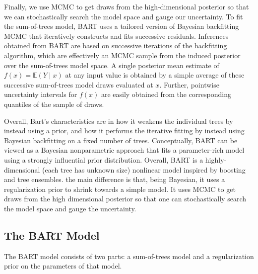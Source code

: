\documentclass[a4paper,11pt]{article}
\begin{document}
Finally, we use MCMC to get draws from the high-dimensional posterior so that  we can stochastically search the model space and gauge our uncertainty. To fit the sum-of-trees model, BART uses a tailored version of Bayesian backfitting MCMC \cite{hastie2000} that iteratively constructs and fits successive residuals.  Inferences obtained from BART are based on successive iterations of the backfitting algorithm, which are effectively an MCMC sample from the induced posterior over the sum-of-trees model space. A single posterior mean estimate of \( f(x) = \mathbb{E}(Y \mid x) \) at any input value is obtained by a simple average of these successive sum-of-trees model draws evaluated at \( x \). Further, pointwise uncertainty intervals for \( f(x) \) are easily obtained from the corresponding quantiles of the sample of draws.


Overall, Bart's characteristics are in how it weakens the individual trees by instead using a prior, and how it performs the iterative fitting by instead using Bayesian backfitting on a fixed number of trees. 
Conceptually, BART can be viewed as a Bayesian nonparametric approach that fits a parameter-rich model using a strongly influential prior distribution. Overall, BART is a highly-dimensional (each tree has unknown size) nonlinear model inspired by boosting and tree ensembles. the main difference is that, being Bayesian, it uses a regularization prior to shrink towards a simple model. It uses MCMC to get draws from the high dimensional posterior so that one can stochastically search the  model space and gauge the uncertainty.

\subsection{The BART Model}
The BART model consists of two parts: a sum-of-trees model and a regularization prior on the parameters of that model.
\end{document}
